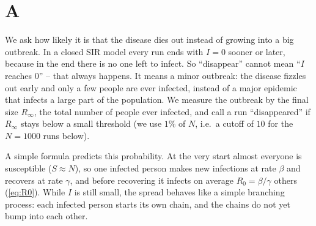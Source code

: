 \section*{A}
\label{sec:taska}

We ask how likely it is that the disease dies out instead of growing into a big
outbreak. In a closed SIR model every run ends with $I=0$ sooner or later,
because in the end there is no one left to infect. So ``disappear'' cannot mean
``$I$ reaches $0$'' -- that always happens. It means a minor outbreak:
the disease fizzles out early and only a few people are ever infected, instead
of a major epidemic that infects a large part of the population. We
measure the outbreak by the final size $R_\infty$, the total number of people
ever infected, and call a run ``disappeared'' if $R_\infty$ stays below a small
threshold (we use $1\%$ of $N$, i.e.\ a cutoff of $10$ for the $N=1000$ runs
below).

A simple formula predicts this probability. At the very start almost everyone is
susceptible ($S\approx N$), so one infected person makes new infections at rate
$\beta$ and recovers at rate $\gamma$, and before recovering it infects on
average $R_0=\beta/\gamma$ others (\autoref{eq:R0}). While $I$ is still small,
the spread behaves like a simple branching process: each infected person starts
its own chain, and the chains do not yet bump into each other.

